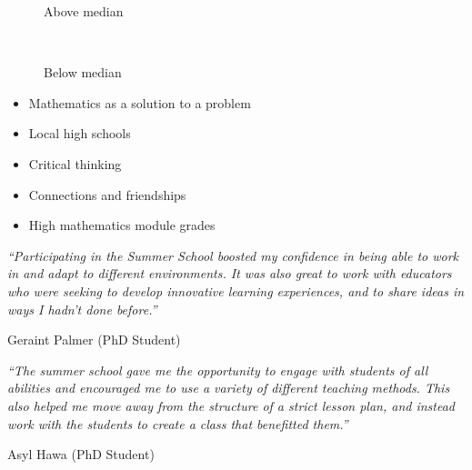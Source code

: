 \documentclass{beamer}
\begin{document}
    \begin{frame}
        \begin{table}[!hbtp]
            \tiny
            \centering

            \begin{subfigure}[t]{.5\textwidth}
                \centering
                
                \caption{Above
                median}
            \end{subfigure}%
            ~
            \begin{subfigure}[t]{.5\textwidth}
                \centering
                
                \caption{Below
                median}
            \end{subfigure}%
        \end{table}
    \end{frame}

    \begin{frame}
        \begin{itemize}
            \setlength\itemsep{1em}
            \item Mathematics as a solution to a problem
            \item Local high schools
            \item Critical thinking
            \item Connections and friendships
            \item High mathematics module grades
        \end{itemize}
    \end{frame}

    \begin{frame}
        \textit{``Participating in the Summer School boosted my confidence in being
            able to work in and adapt to different environments. It was also great
            to work with educators who were seeking to develop innovative learning
        experiences, and to share ideas in ways I hadn't done before.''}
        \begin{flushright} 
            Geraint Palmer (PhD Student)
        \end{flushright}

        \vfill

        \textit{``The summer school gave me the opportunity to engage with students
            of all abilities and encouraged me to use a variety of different
            teaching methods. This also helped me move away from the structure of a
            strict lesson plan, and instead work with the students to create a class
        that benefitted them.''} 
        \begin{flushright}
            Asyl Hawa (PhD Student)
        \end{flushright}
    \end{frame}
\end{document}
